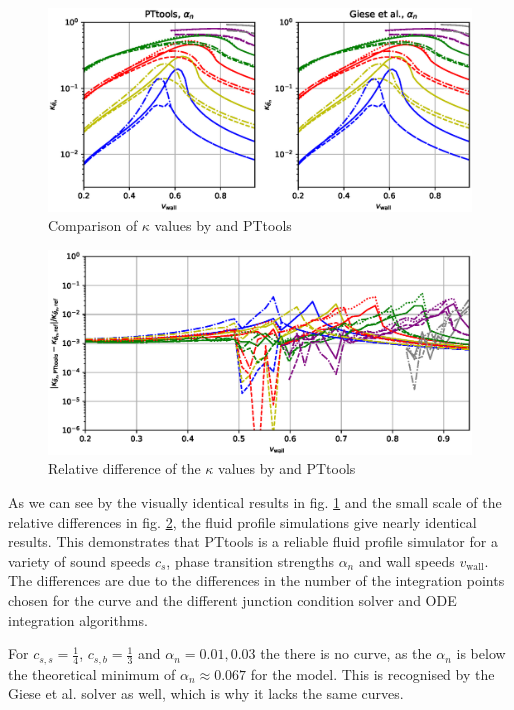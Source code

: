 \begin{figure}[ht!]
\centering
\includegraphics[width=\textwidth]{fig/giese_lisa_fig2_alpha_n.eps}
\caption{Comparison of $\kappa$ values by \cite[fig. 2]{giese_2021} and PTtools}
\label{fig:kappa_giese}
\end{figure}

\begin{figure}[ht!]
\centering
\includegraphics[width=\textwidth]{fig/giese_lisa_fig2_alpha_n_diff.eps}
\caption{Relative difference of the $\kappa$ values by \cite[fig. 2]{giese_2021} and PTtools}
\label{fig:kappa_giese_diff}
\end{figure}

As we can see by the visually identical results in fig. \ref{fig:kappa_giese}
and the small scale of the relative differences in fig. \ref{fig:kappa_giese_diff},
the fluid profile simulations give nearly identical results.
This demonstrates that PTtools is a reliable fluid profile simulator for a variety of
sound speeds $c_s$, phase transition strengths $\alpha_n$ and wall speeds $v_\text{wall}$.
The differences are due to the differences in the number of the integration points chosen for the curve
and the different junction condition solver and ODE integration algorithms.

For $c_{s,s}=\frac{1}{4}$, $c_{s,b}=\frac{1}{3}$ and $\alpha_n = 0.01, 0.03$ the there is no curve,
as the $\alpha_n$ is below the theoretical minimum of $\alpha_n \approx 0.067$ for the model.
This is recognised by the Giese et al. solver as well,
which is why it lacks the same curves.

